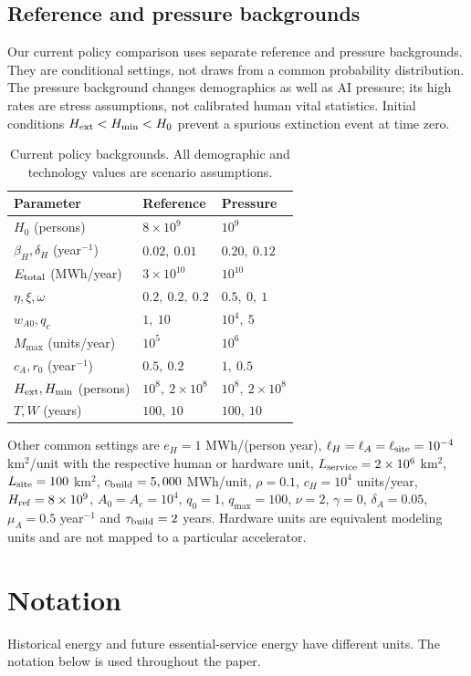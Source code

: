 \documentclass[12pt,a4paper]{article}
\theoremstyle{remark}
\begin{document}
\subsection{Reference and pressure backgrounds}
Our current policy comparison uses separate reference and pressure backgrounds. They are conditional settings, not draws from a common probability distribution. The pressure background changes demographics as well as AI pressure; its high rates are stress assumptions, not calibrated human vital statistics. Initial conditions $H_{\rm ext}<H_{\min}<H_0$ prevent a spurious extinction event at time zero.

\begin{table}[!htb]\centering\small
\caption{Current policy backgrounds. All demographic and technology values are scenario assumptions.}\label{tab:background}
\begin{tabular}{@{}lll@{}}\toprule
Parameter & Reference & Pressure\\\midrule
$H_0$ (persons) & $8\times10^9$ & $10^9$\\
$\beta_H,\delta_H$ (year$^{-1}$) & $0.02,\ 0.01$ & $0.20,\ 0.12$\\
$E_{\rm total}$ (MWh/year) & $3\times10^{10}$ & $10^{10}$\\
$\eta,\xi,\omega$ & $0.2,\ 0.2,\ 0.2$ & $0.5,\ 0,\ 1$\\
$w_{A0},q_c$ & $1,\ 10$ & $10^4,\ 5$\\
$M_{\max}$ (units/year) & $10^5$ & $10^6$\\
$c_A,r_0$ (year$^{-1}$) & $0.5,\ 0.2$ & $1,\ 0.5$\\
$H_{\rm ext},H_{\min}$ (persons) & $10^8,\ 2\times10^8$ & $10^8,\ 2\times10^8$\\
$T,W$ (years) & $100,\ 10$ & $100,\ 10$\\
\bottomrule
\end{tabular}
\end{table}

Other common settings are $e_H=1$ MWh/(person year), $\ell_H=\ell_A=\ell_{\rm site}=10^{-4}$ km$^2$/unit with the respective human or hardware unit, $L_{\rm service}=2\times10^6$ km$^2$, $L_{\rm site}=100$ km$^2$, $c_{\rm build}=5,000$ MWh/unit, $\rho=0.1$, $c_H=10^4$ units/year, $H_{\rm ref}=8\times10^9$, $A_0=A_c=10^4$, $q_0=1$, $q_{\max}=100$, $\nu=2$, $\gamma=0$, $\delta_A=0.05$, $\mu_A=0.5$ year$^{-1}$ and $\tau_{\rm build}=2$ years. Hardware units are equivalent modeling units and are not mapped to a particular accelerator.

\section{Notation}\label{sec:notation}
Historical energy and future essential-service energy have different units. The notation below is used throughout the paper.
\end{document}
